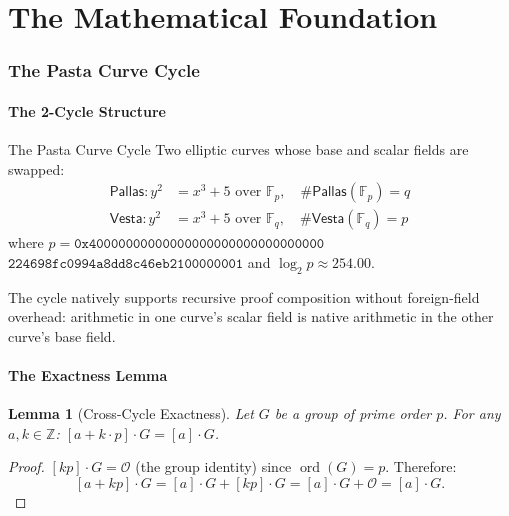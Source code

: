 \documentclass[11pt, a4paper]{article}
\theoremstyle{plain}
\newtheorem{lemma}[theorem]{Lemma}
\theoremstyle{definition}
\theoremstyle{remark}
\newcommand{\fieldp}{\mathbb{F}_p}
\newcommand{\fieldq}{\mathbb{F}_q}
\begin{document}
\part{The Mathematical Foundation}

\section{The Pasta Curve Cycle}
\label{sec:pasta}

\subsection{The 2-Cycle Structure}

\begin{defnbox}{The Pasta Curve Cycle}
Two elliptic curves whose base and scalar fields are swapped:
\begin{align}
\textsf{Pallas}: y^2 &= x^3 + 5 \text{ over } \fieldp, \quad
\#\textsf{Pallas}(\fieldp) = q \label{eq:pallas}\\
\textsf{Vesta}: y^2 &= x^3 + 5 \text{ over } \fieldq, \quad
\#\textsf{Vesta}(\fieldq) = p \label{eq:vesta}
\end{align}
where $p = \texttt{0x40000000000000000000000000000000}$  $\texttt{224698fc0994a8dd8c46eb2100000001}$ and
 $\log_2 p \approx 254.00$.
\end{defnbox}

The cycle natively supports recursive proof composition without
foreign-field overhead: arithmetic in one curve's scalar field is
native arithmetic in the other curve's base field.

\subsection{The Exactness Lemma}

\begin{lemma}[Cross-Cycle Exactness]
\label{lem:exactness}
Let $G$ be a group of prime order $p$. For any $a, k \in \mathbb{Z}$:
 $[a + k \cdot p] \cdot G = [a] \cdot G$.
\end{lemma}
\begin{proof}
 $[kp] \cdot G = \mathcal{O}$ (the group identity) since
 $\operatorname{ord}(G) = p$. Therefore:
\[ [a + kp] \cdot G = [a] \cdot G + [kp] \cdot G = [a] \cdot G + \mathcal{O} = [a] \cdot G. \]
\end{proof}
\end{document}

